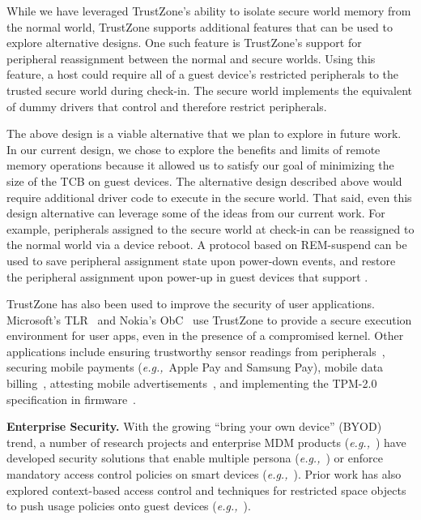 \documentclass[pageno]{sig-alternate-05-2015}
\newcommand{\myparagraph}[1]{\indent\par\noindent\textsf{\textbf{#1.}}}
\newcommand{\eg}{\textit{e.g.,}}
\newcommand{\addtext}[2]{#2}
\begin{document}
\addtext{Task 4}{While we have leveraged TrustZone's ability to isolate secure
world memory from the normal world, TrustZone supports additional features that
can be used to explore alternative designs. One such feature is TrustZone's
support for peripheral reassignment between the normal and secure worlds. Using
this feature, a host could require all of a guest device's restricted
peripherals to the trusted secure world during check-in. The secure world
implements the equivalent of dummy drivers that control and therefore restrict
peripherals.}

\addtext{Task 4}{The above design is a viable alternative that we plan to
explore in future work. In our current design, we chose to explore the benefits
and limits of remote memory operations because it allowed us to satisfy our
goal of minimizing the size of the TCB on guest devices. The alternative design
described above would require additional driver code to execute in the secure
world. That said, even this design alternative can leverage some of the ideas
from our current work. For example, peripherals assigned to the secure world
at check-in can be reassigned to the normal world via a device reboot. A
protocol based on REM-suspend can be used to save peripheral assignment state
upon power-down events, and restore the peripheral assignment upon power-up 
in guest devices that support \kdev. }

TrustZone has also been used to improve the security of user applications.
Microsoft's TLR~\cite{tlr:asplos14} and Nokia's ObC~\cite{obc:asiaccs09} use
TrustZone to provide a secure execution environment for user apps, even in the
presence of a compromised kernel. Other applications include ensuring
trustworthy sensor readings from peripherals~\cite{tenor:mobisys12}, securing
mobile payments (\eg~Apple Pay and Samsung Pay), \addtext{Task 9}{mobile data
billing~\cite{billsplit:hotmobile13}, attesting mobile
advertisements~\cite{adattester:mobisys15}, and implementing the TPM-2.0
specification in firmware~\cite{ftpm:msrtr}.}

\myparagraph{Enterprise Security} With the growing ``bring your own device''
(BYOD) trend, a number of research projects and enterprise MDM products
(\eg~\cite{knox:mdm,ms:intune,blackberry:emm}) have developed security
solutions that enable multiple persona
(\eg~\cite{asm:sec14,flaskdroid:sec13,cells:sosp11}) or enforce mandatory
access control policies on smart devices
(\eg~\cite{deepdroid:ndss15,seandroid:ndss13,flaskdroid:sec13,asm:sec14}).
Prior work has also explored context-based access control and techniques for
restricted space objects to push usage policies onto guest devices
(\eg~\cite{saint:acsac09,Covington2002,conxsense:asiaccs14,worlddriven:ccs14,blindspot:2009,markit:upside14}).
\end{document}
